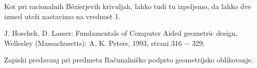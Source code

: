 \documentclass[a4paper,10pt]{article}
\begin{document}
Kot pri racionalnih Bézierjevih krivuljah, lahko tudi tu izpeljemo, da lahko dve izmed uteži nastavimo na vrednost 1.


\begin{thebibliography}{9}
    J. Hoschek, D. Lasser: Fundamentals of Computer Aided geometric design,
    Wellesley (Massachusetts): A. K. Peters, 1993, strani 316 $-$ 329.

    Zapiski predavanj pri predmetu Računalniško podprto geometrijsko oblikovanje.
\end{thebibliography}
\end{document}
